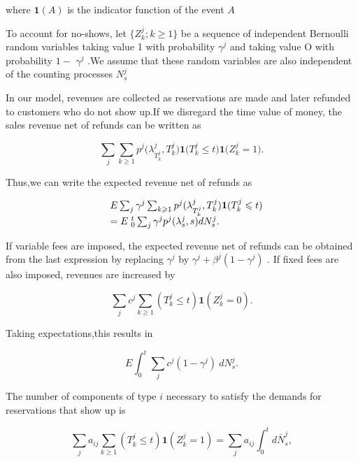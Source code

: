 where \(\mathbf { 1 } ( A )\) is the indicator function of the event
\(A\)

To account for no-shows, let \(\{ Z _ { k } ^ { j } ; k \ge 1 \}\) be a
sequence of independent Bernoulli random variables taking value 1 with
probability \(\gamma ^ { j }\) and taking value O with probability
\(1 -\) \(\gamma ^ { j }\) .We assume that these random variables are
also independent of the counting processes \(N _ { s } ^ { j }\)

In our model, revenues are collected as reservations are made and later
refunded to customers who do not show up.If we disregard the time value
of money, the sales revenue net of refunds can be written as

\[
\sum _ { j } \sum _ { k \geqslant 1 } p ^ { j } \big ( \lambda _ { T _ { k } ^ { j } } ^ { j } , T _ { k } ^ { j } \big ) \mathbf { 1 } \big ( T _ { k } ^ { j } \leqslant t \big ) \mathbf { 1 } \big ( Z _ { k } ^ { j } = 1 \big ) .
\]

Thus,we can write the expected revenue net of refunds as

\[
\begin{array} { r l } { { } } & { { E \sum _ { j } \gamma ^ { j } \sum _ { k \geqslant 1 } p ^ { j } ( \lambda _ { T _ { k } ^ { j } } ^ { j } , T _ { k } ^ { j } ) \mathbf { 1 } ( T _ { k } ^ { j } \leqslant t ) } } \\ { { } } & { { = E \left. _ { 0 } ^ { t } \sum _ { j } \gamma ^ { j } p ^ { j } ( \lambda _ { s } ^ { j } , s ) d N _ { s } ^ { j } . \right. } } \end{array}
\]

If variable fees are imposed, the expected revenue net of refunds can be
obtained from the last expression by replacing \(\gamma ^ { j }\) by
\(\gamma ^ { j } + \beta ^ { j } ( 1 - \gamma ^ { j } )\) . If fixed
fees are also imposed, revenues are increased by

\[
\sum _ { j } c ^ { j } \sum _ { k \geq 1 } ( T _ { k } ^ { j } \leqslant t ) \mathbf { 1 } ( Z _ { k } ^ { j } = 0 ) .
\]

Taking expectations,this results in

\[
E \int _ { 0 } ^ { t } \sum _ { j } c ^ { j } ( 1 - \gamma ^ { j } ) \ d N _ { s } ^ { j } .
\]

The number of components of type \(i\) necessary to satisfy the demands
for reservations that show up is

\[
\sum _ { j } a _ { i j } \sum _ { k \geqslant 1 } ( T _ { k } ^ { j } \leqslant t ) \mathbf { 1 } ( Z _ { k } ^ { j } = 1 ) = \sum _ { j } a _ { i j } \int _ { 0 } ^ { t } d \bar { N } _ { s } ^ { j } ,
\]

